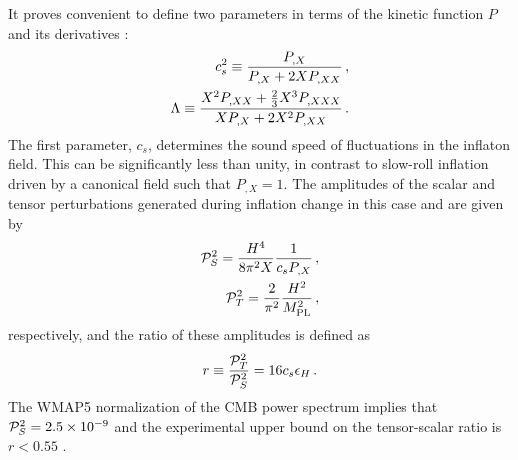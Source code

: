 It proves convenient to define two parameters in terms of the 
kinetic  function $P$ and its derivatives \cite{lidser1,lidser3}: 
% 
\begin{eqnarray}
\label{eq:defcs-dbiintro}
 c_s^2 \equiv \frac{P_{,X}}{P_{,X} + 2X P_{,XX}} \,,
\\
\label{eq:deflambda-dbiintro}
\Lambda \equiv  \frac{X^2 P_{,XX} +
\frac{2}{3}X^3 P_{,XXX}}{X P_{,X} +
2X^2 P_{,XX}}\,.
\end{eqnarray}
% 
The first parameter, $c_s$, determines the sound speed of fluctuations 
in the inflaton field. This can be significantly less than unity, 
in contrast to slow-roll inflation driven by a canonical 
field such that $P_{,X} =1$.
The amplitudes of the scalar and tensor perturbations 
generated during inflation change in this case and are given by \cite{gm}
% 
\begin{eqnarray} 
\label{eq:Ps-dbiintro}
 \mathcal{P}_S^2 = \frac{H^4}{8\pi^2 X}\frac{1}{c_s P_{,X}} \,,
\\
\label{eq:Pt-dbiintro}
\mathcal{P}_T^2 = \frac{2}{\pi^2} \frac{H^2}{M_{\mathrm{PL}}^2} \,,
\end{eqnarray}
% 
respectively, and the ratio of these amplitudes 
is defined as \cite{gm} 
% 
\begin{equation}
\label{eq:rdefn-dbiintro}
r\equiv \frac{\mathcal{P}_T^2}{\mathcal{P}_S^2} = 16c_s \epsilon_H \,.
\end{equation}
%   
The WMAP5 normalization of the CMB power spectrum 
implies that $\mathcal{P}_S^2= 2.5\times10^{-9}$ and 
the experimental upper bound on the tensor-scalar 
ratio is $r <0.55$ \cite{Komatsu:2008hk}.

